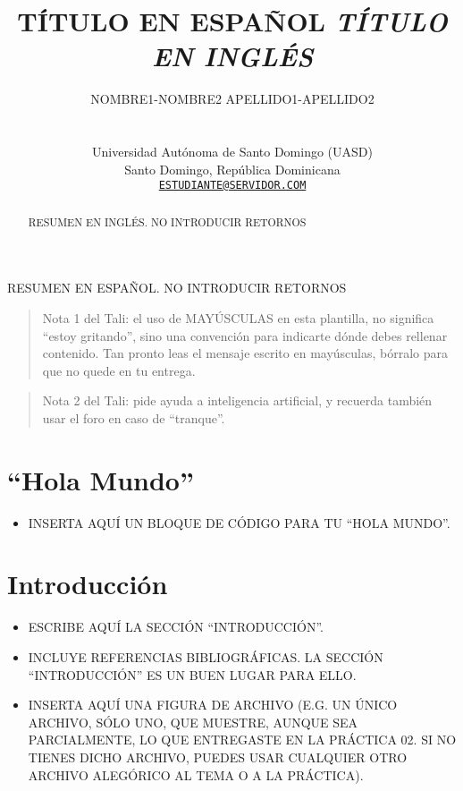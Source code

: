 \documentclass[spanish]{article}
\title{TÍTULO EN ESPAÑOL \newline \textit{\large TÍTULO EN INGLÉS}}
\author{
    \parbox[t]{10cm}{\centering NOMBRE1-NOMBRE2 APELLIDO1-APELLIDO2 \\ \orcidlink{CÓDIGO ORCID}}
   \\
    Universidad Autónoma de Santo Domingo (UASD) \\
  Santo Domingo, República Dominicana \\
  \texttt{\href{mailto:ESTUDIANTE@SERVIDOR.COM}{\nolinkurl{ESTUDIANTE@SERVIDOR.COM}}} \\
  }
\providecommand{\tightlist}{%
  \setlength{\itemsep}{0pt}\setlength{\parskip}{0pt}}
\begin{document}
\maketitle


\begin{resumen}
RESUMEN EN ESPAÑOL. NO INTRODUCIR RETORNOS
\end{resumen}



\begin{abstract}
RESUMEN EN INGLÉS. NO INTRODUCIR RETORNOS
\end{abstract}


\begin{quote}
Nota 1 del Tali: el uso de MAYÚSCULAS en esta plantilla, no significa
``estoy gritando'', sino una convención para indicarte dónde debes
rellenar contenido. Tan pronto leas el mensaje escrito en mayúsculas,
bórralo para que no quede en tu entrega.
\end{quote}

\begin{quote}
Nota 2 del Tali: pide ayuda a inteligencia artificial, y recuerda
también usar el foro en caso de ``tranque''.
\end{quote}

\section*{``Hola Mundo''}\label{hola-mundo}

\begin{itemize}
\tightlist
\item
  INSERTA AQUÍ UN BLOQUE DE CÓDIGO PARA TU ``HOLA MUNDO''.
\end{itemize}

\section{Introducción}\label{introducciuxf3n}

\begin{itemize}
\item
  ESCRIBE AQUÍ LA SECCIÓN ``INTRODUCCIÓN''.
\item
  INCLUYE REFERENCIAS BIBLIOGRÁFICAS. LA SECCIÓN ``INTRODUCCIÓN'' ES UN
  BUEN LUGAR PARA ELLO.
\item
  INSERTA AQUÍ UNA FIGURA DE ARCHIVO (E.G. UN ÚNICO ARCHIVO, SÓLO UNO,
  QUE MUESTRE, AUNQUE SEA PARCIALMENTE, LO QUE ENTREGASTE EN LA PRÁCTICA
  02. SI NO TIENES DICHO ARCHIVO, PUEDES USAR CUALQUIER OTRO ARCHIVO
  ALEGÓRICO AL TEMA O A LA PRÁCTICA).
\end{itemize}
\end{document}
